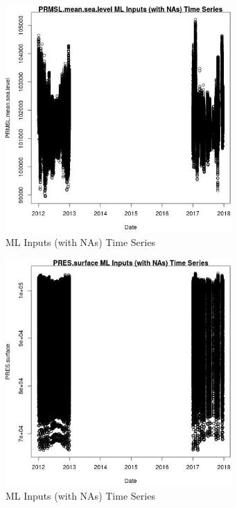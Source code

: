 \begin{figure} 
\centering  
\includegraphics[width=0.77\textwidth]{Code_Outputs/Report_ML_input_PM25_Step4_part_e_de_duplicated_aves_compiled_2019-05-14wNAs_PRMSLmeansealevelvDate.jpg} 
\caption{\label{fig:Report_ML_input_PM25_Step4_part_e_de_duplicated_aves_compiled_2019-05-14wNAsPRMSLmeansealevelvDate}ML Inputs (with NAs) Time Series} 
\end{figure} 
 

\begin{figure} 
\centering  
\includegraphics[width=0.77\textwidth]{Code_Outputs/Report_ML_input_PM25_Step4_part_e_de_duplicated_aves_compiled_2019-05-14wNAs_PRESsurfacevDate.jpg} 
\caption{\label{fig:Report_ML_input_PM25_Step4_part_e_de_duplicated_aves_compiled_2019-05-14wNAsPRESsurfacevDate}ML Inputs (with NAs) Time Series} 
\end{figure} 
 

